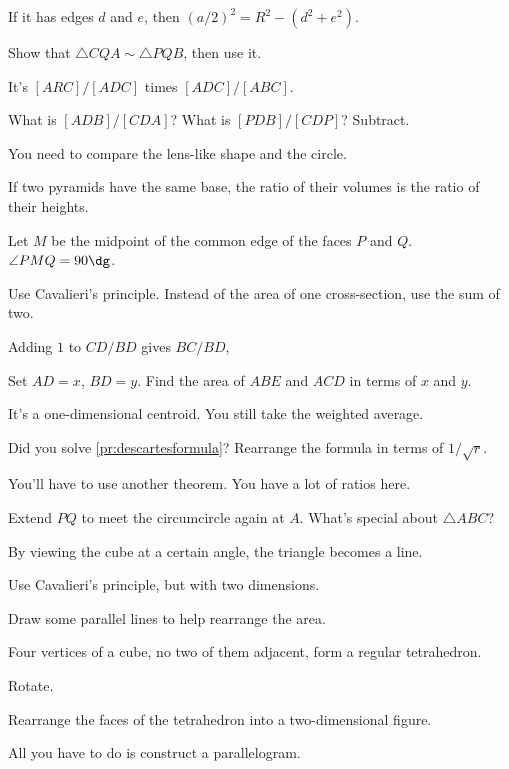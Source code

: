 \documentclass[11pt,paper=letter]{scrartcl}
\begin{document}
\begin{enumthin}[leftmargin=0pt]
\item \label{h:gbb4} If it has edges $d$ and $e$, then $(a/2)^2 = R^2 - (d^2 + e^2)$.
\item \label{h:vs32} Show that $\triangle CQA \sim \triangle PQB$, then use it.
\item \label{h:rt02} It's $[ARC]/[ADC]$ times $[ADC]/[ABC]$.
\item \label{h:cv02} What is $[ADB]/[CDA]$? What is $[PDB]/[CDP]$? Subtract.
\item \label{h:np22} You need to compare the lens-like shape and the circle.
\item \label{h:gbd3} If two pyramids have the same base, the ratio of their volumes is the ratio of their heights.
\item \label{h:eq32} Let $M$ be the midpoint of the common edge of the faces $P$ and $Q$. $\angle PMQ = 90\dg$.
\item \label{h:np11} Use Cavalieri's principle. Instead of the area of one cross-section, use the sum of two.
\item \label{h:rt05} Adding $1$ to $CD/BD$ gives $BC/BD$,
\item \label{h:pt52} Set $AD = x$, $BD = y$. Find the area of $ABE$ and $ACD$ in terms of $x$ and $y$.
\item \label{h:pc21} It's a one-dimensional centroid. You still take the weighted average.
\item \label{h:dt31} Did you solve \autoref{pr:descartesformula}? Rearrange the formula in terms of $1/\sqrt{r}$.
\item \label{h:rt03} You'll have to use another theorem. You have a lot of ratios here.
\item \label{h:vs31} Extend $PQ$ to meet the circumcircle again at $A$. What's special about $\triangle ABC$?
\item \label{h:gbc2} By viewing the cube at a certain angle, the triangle becomes a line.
\item \label{h:np21} Use Cavalieri's principle, but with two dimensions.
\item \label{h:os40} Draw some parallel lines to help rearrange the area.
\item \label{h:eq43} Four vertices of a cube, no two of them adjacent, form a regular tetrahedron.
\item \label{h:pt41} Rotate.
\item \label{h:gbf2} Rearrange the faces of the tetrahedron into a two-dimensional figure.
\item \label{h:pl31} All you have to do is construct a parallelogram.

\end{enumthin}
\end{document}
